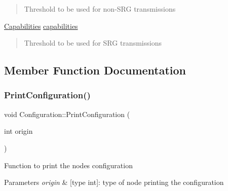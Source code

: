 \begin{DoxyCompactItemize}
\begin{DoxyCompactList}
\begin{quote}
Threshold to be used for non-\/\+S\+RG transmissions \end{quote}
\end{DoxyCompactList}\item 
\mbox{\label{structConfiguration_af23b3d2295e2948d6924abca9de961f6}} 
\hyperlink{structCapabilities}{Capabilities} \hyperlink{structConfiguration_af23b3d2295e2948d6924abca9de961f6}{capabilities}
\begin{DoxyCompactList}\small\item\em \begin{quote}
Threshold to be used for S\+RG transmissions \end{quote}
\end{DoxyCompactList}\end{DoxyCompactItemize}


\subsection{Member Function Documentation}
\mbox{\label{structConfiguration_ab77ba6f9704fe0ac90f92f8944268845}} 
\subsubsection{\texorpdfstring{Print\+Configuration()}{PrintConfiguration()}}
{\footnotesize\ttfamily void Configuration\+::\+Print\+Configuration (\begin{DoxyParamCaption}\item[{int}]{origin }\end{DoxyParamCaption})\hspace{0.3cm}{\ttfamily [inline]}}

Function to print the node\textquotesingle{}s configuration 
\begin{DoxyParams}{Parameters}
{\em origin} & \mbox{[}type int\mbox{]}\+: type of node printing the configuration \\
\hline
\end{DoxyParams}
\mbox{\label{structConfiguration_acdb9f693e0b773ee8ffb7cf18dad69d7}} 
